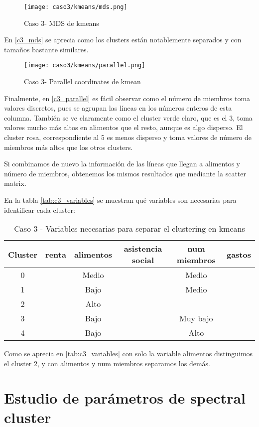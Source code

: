 \begin{figure}[H]
\caption{Caso 3- MDS de kmeans}
\label{c3_mds}
\texttt{[image: caso3/kmeans/mds.png]}
\end{figure}

En \eqref{c3_mds} se aprecia como los clusters están notablemente separados y con tamaños bastante similares.

\begin{figure}[H]
\caption{Caso 3- Parallel coordinates de kmean}
\label{c3_parallel}
\texttt{[image: caso3/kmeans/parallel.png]}
\end{figure}

Finalmente, en \eqref{c3_parallel} es fácil observar como el número de miembros toma valores discretos, pues se agrupan las líneas en los números enteros de esta columna. También se ve claramente como el cluster verde claro, que es el 3, toma valores mucho más altos en alimentos que el resto, aunque es algo disperso. El cluster rosa, correspondiente al 5 es menos disperso y toma valores de número de miembros más altos que los otros clusters.

Si combinamos de nuevo la información de las líneas que llegan a alimentos y número de miembros, obtenemos los mismos resultados que mediante la scatter matrix.



En la tabla  \eqref{tab:c3_variables} se muestran qué variables son necesarias para identificar cada cluster:

\begin{table}[H]
\centering
\caption{Caso 3 - Variables necesarias para separar el clustering en kmeans}
\label{tab:c3_variables}
\begin{tabular}{cccccc}
\toprule
 Cluster & renta & alimentos & asistencia social & num miembros & gastos \\
\midrule
0 & & Medio & & Medio & \\
1 & & Bajo & & Medio & \\
2 & & Alto & & & \\
3 & & Bajo & & Muy bajo & \\
4 & & Bajo & & Alto & \\
\bottomrule
\end{tabular}
\end{table}
Como se aprecia en \eqref{tab:c3_variables} con solo la variable alimentos distinguimos el cluster 2, y con alimentos y num miembros separamos los demás.

\section{Estudio de parámetros de spectral cluster}

